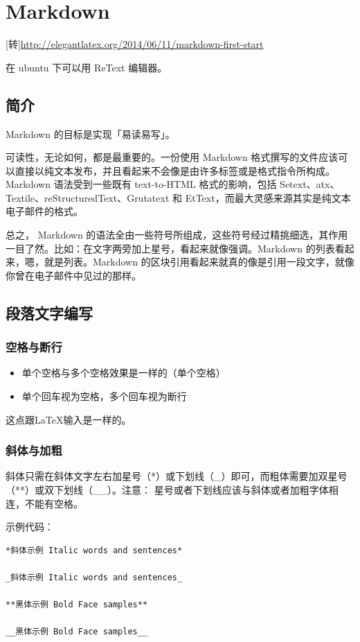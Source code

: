 \chapter{Markdown}
[转]\url{http://elegantlatex.org/2014/06/11/markdown-first-start}

在 ubuntu 下可以用 ReText 编辑器。

\section{简介}
Markdown 的目标是实现「易读易写」。

可读性，无论如何，都是最重要的。一份使用 Markdown 格式撰写的文件应该可以直接以纯文本发布，并且看起来不会像是由许多标签或是格式指令所构成。Markdown 语法受到一些既有 text-to-HTML 格式的影响，包括 Setext、atx、Textile、reStructuredText、Grutatext 和 EtText，而最大灵感来源其实是纯文本电子邮件的格式。

总之， Markdown 的语法全由一些符号所组成，这些符号经过精挑细选，其作用一目了然。比如：在文字两旁加上星号，看起来就像强调。Markdown 的列表看起来，嗯，就是列表。Markdown 的区块引用看起来就真的像是引用一段文字，就像你曾在电子邮件中见过的那样。


\section{段落文字编写}
\subsection{空格与断行}
\begin{itemize}
\item 单个空格与多个空格效果是一样的（单个空格）
\item 单个回车视为空格，多个回车视为断行
\end{itemize}
这点跟\LaTeX 输入是一样的。


\subsection{斜体与加粗}
斜体只需在斜体文字左右加星号（*）或下划线（\_）即可，而粗体需要加双星号（**）或双下划线（\_\_）。注意： 星号或者下划线应该与斜体或者加粗字体相连，不能有空格。

示例代码：
\begin{verbatim}
*斜体示例 Italic words and sentences*

_斜体示例 Italic words and sentences_

**黑体示例 Bold Face samples**

__黑体示例 Bold Face samples__
\end{verbatim}


